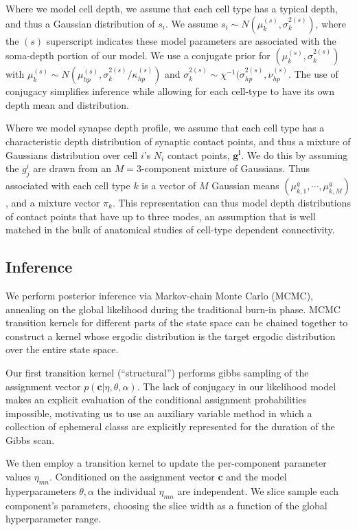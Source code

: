 \documentclass{article}
\renewcommand{\vec}[1]{\mathbf{#1}}
\begin{document}
Where we model cell depth, we assume that 
each cell type has a typical depth, and thus a Gaussian distribution
of $s_i$. We assume $s_i \sim N(\mu^{(s)}_k,
\sigma^{2(s)}_k)$, where the $(s)$ superscript indicates
these model parameters are associated with the soma-depth 
portion of our model.  We use a conjugate prior for $(\mu^{(s)}_k, \sigma^{2(s)}_k)$ with
$\mu^{(s)}_k \sim N(\mu^{(s)}_{hp}, \sigma^{2(s)}_k/ \kappa^{(s)}_{hp})$ and $\sigma^{2(s)}_k \sim
\chi^{-1}(\sigma^{2(s)}_{hp}, \nu^{(s)}_{hp}$. The use of conjugacy simplifies inference while allowing for each cell-type to have its own depth mean and distribution. 

Where we model synapse depth profile, we assume that each cell
type has a characteristic depth distribution of synaptic contact points, and thus
a mixture of Gaussians distribution over cell $i$’s $N_i$ contact points, $\vec{g^i}$.
We do this by assuming the $g^i_j$
are drawn from an $M=3$-component mixture of Gaussians. Thus associated with each cell type $k$ is a vector
of $M$ Gaussian means $(\mu^g_{k,1}, \cdots, \mu^g_{k, M})$, and a
mixture vector $\pi_k$.  This representation can thus model depth distributions of contact points that have up to three modes, an assumption that is well matched in the bulk of anatomical studies of cell-type dependent connectivity.


\subsection*{Inference} 
We perform posterior inference via Markov-chain Monte Carlo (MCMC),
annealing on the global likelihood during the traditional burn-in
phase. MCMC transition kernels for different parts of the state space
can be chained together to construct a kernel whose ergodic
distribution is the target ergodic distribution over the entire state space. 

Our first transition kernel (``structural'') performs gibbs sampling 
of the assignment vector $p(\vec{c} | \eta, \theta, \alpha)$. 
The lack of conjugacy in our likelihood model makes an explicit 
evaluation of the conditional assignment probabilities impossible, 
motivating us to use an auxiliary variable method \autocite{Neal2000}
in which a collection of ephemeral classs are explicitly represented
for the duration of the Gibbs scan. 

We then employ a transition kernel to update the per-component
parameter values $\eta_{mn}$. Conditioned on the assignment vector
$\vec{c}$ and the model hyperparameters $\theta, \alpha$ the 
individual $\eta_{mn}$ are independent. We slice sample \autocite{Neal2003}
each component's parameters, choosing the slice width as a function
of the global hyperparameter range. 
\end{document}
